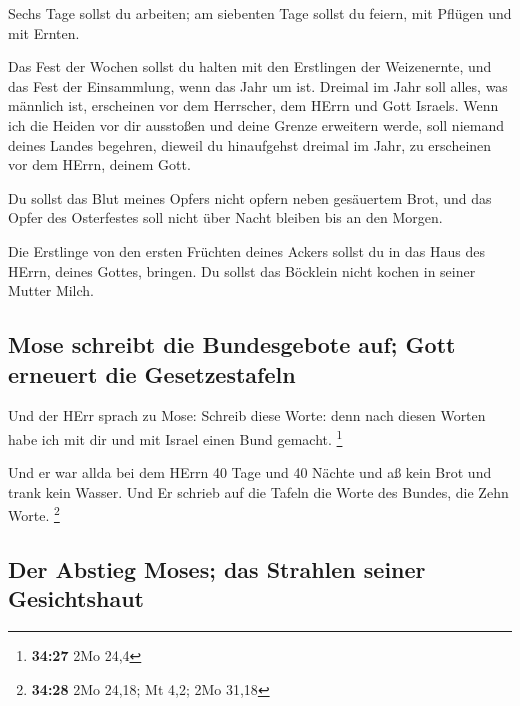  Sechs Tage sollst du arbeiten; am siebenten Tage sollst
du feiern, mit Pflügen und mit Ernten.

 Das Fest der Wochen sollst du halten mit den Erstlingen
der Weizenernte, und das Fest der Einsammlung, wenn das Jahr um ist.
 Dreimal im Jahr soll alles, was männlich ist, erscheinen
vor dem Herrscher, dem HErrn und Gott Israels.  Wenn ich
die Heiden vor dir ausstoßen und deine Grenze erweitern werde, soll
niemand deines Landes begehren, dieweil du hinaufgehst dreimal im Jahr,
zu erscheinen vor dem HErrn, deinem Gott.

 Du sollst das Blut meines Opfers nicht opfern neben
gesäuertem Brot, und das Opfer des Osterfestes soll nicht über Nacht
bleiben bis an den Morgen.

 Die Erstlinge von den ersten Früchten deines Ackers
sollst du in das Haus des HErrn, deines Gottes, bringen. Du sollst das
Böcklein nicht kochen in seiner Mutter Milch.

\hypertarget{mose-schreibt-die-bundesgebote-auf-gott-erneuert-die-gesetzestafeln}{%
\subsection{Mose schreibt die Bundesgebote auf; Gott erneuert die
Gesetzestafeln}\label{mose-schreibt-die-bundesgebote-auf-gott-erneuert-die-gesetzestafeln}}

 Und der HErr sprach zu Mose: Schreib diese Worte: denn
nach diesen Worten habe ich mit dir und mit Israel einen Bund gemacht.
\footnote{\textbf{34:27} 2Mo 24,4}

 Und er war allda bei dem HErrn 40 Tage und 40 Nächte und
aß kein Brot und trank kein Wasser. Und Er schrieb auf die Tafeln die
Worte des Bundes, die Zehn Worte. \footnote{\textbf{34:28} 2Mo 24,18; Mt
  4,2; 2Mo 31,18}

\hypertarget{der-abstieg-moses-das-strahlen-seiner-gesichtshaut}{%
\subsection{Der Abstieg Moses; das Strahlen seiner
Gesichtshaut}\label{der-abstieg-moses-das-strahlen-seiner-gesichtshaut}}

